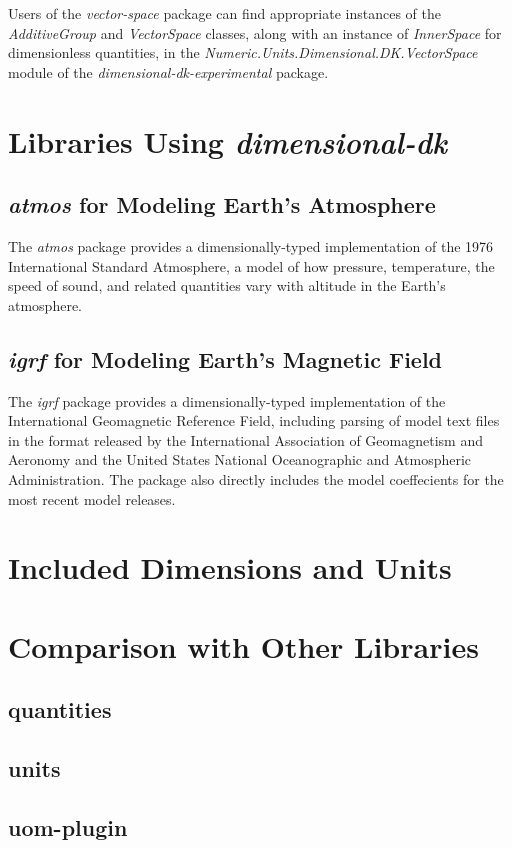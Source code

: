 \documentclass[12pt]{report}
\newcommand{\packagename}[1]{\textit{#1}}
\newcommand{\thispackage}{\packagename{dimensional-dk}}
\newcommand{\experimentalpackage}{\packagename{dimensional-dk-experimental}}
\newcommand{\classname}[1]{\textit{#1}}
\newcommand{\modulename}[1]{\textit{#1}}
\newcommand{\submodule}[1]{\modulename{Numeric.Units.Dimensional.DK.{#1}}}
\begin{document}
Users of the \packagename{vector-space} package can find appropriate instances of
the \classname{AdditiveGroup} and \classname{VectorSpace} classes, along with an
instance of \classname{InnerSpace} for dimensionless quantities, in the
\submodule{VectorSpace} module of the \experimentalpackage{} package.

\chapter{Libraries Using \thispackage}

\section{\packagename{atmos} for Modeling Earth's Atmosphere}

The \packagename{atmos} package provides a dimensionally-typed implementation of the 1976 International Standard
Atmosphere, a model of how pressure, temperature, the speed of sound, and related quantities vary with
altitude in the Earth's atmosphere.

\section{\packagename{igrf} for Modeling Earth's Magnetic Field}

The \packagename{igrf} package provides a dimensionally-typed implementation of the International Geomagnetic
Reference Field, including parsing of model text files in the format released by the International Association of
Geomagnetism and Aeronomy and the United States National Oceanographic and Atmospheric Administration. The
package also directly includes the model coeffecients for the most recent model releases.

\chapter{Included Dimensions and Units}

\chapter{Comparison with Other Libraries}

\section{quantities}
\section{units}
\section{uom-plugin}
\end{document}
